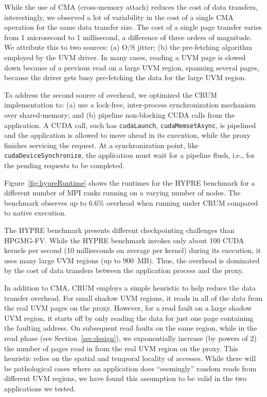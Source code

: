 \documentclass[11pt]{article}
\begin{document}
While the use of CMA (cross-memory attach) reduces the cost of data transfers,
interestingly, we
observed a lot of variability in the cost of a single CMA operation for the same
data transfer size. The cost of a single page transfer varies from 1 microsecond
to 1 millisecond, a difference of three orders of magnitude. We attribute this
to two sources: (a) O/S jitter; (b) the pre-fetching algorithm employed by the
UVM driver. In many cases, reading a UVM page is slowed down because of a
previous read on a large UVM region, spanning several pages, because the driver
gets busy pre-fetching the data for the large UVM region.

To address the second source of overhead, we optimized the CRUM implementation
to: (a) use a lock-free, inter-process synchronization mechanism over
shared-memory; and (b) pipeline non-blocking CUDA calls from the application. A
CUDA call, such has {\tt cudaLaunch}, {\tt cudaMemsetAsync}, is pipelined and
the application is allowed to move ahead in its execution, while the proxy
finishes servicing the request. At a synchronization point, like {\tt cudaDeviceSynchronize},
the application must wait for a pipeline flush, i.e., for the pending requests
to be completed.


Figure~\ref{fig:hypreRuntime} shows the runtimes for the HYPRE benchmark for a different
number of MPI ranks running on a varying number of nodes. The benchmark observes
up to 6.6\% overhead when running under CRUM compared to native execution.

The HYPRE benchmark presents different checkpointing challenges than HPGMG-FV.  While the HYPRE benchmark
invokes only about 100 CUDA kernels per second (10 milliseconds on average per
kernel) during its execution, it uses many large UVM regions (up to 900~MB).
Thus, the overhead is dominated by the cost of data transfers between the application
process and the proxy.

In addition to CMA, CRUM employs a simple heuristic to help reduce the data
transfer overhead.  For small shadow UVM regions, it reads in all of the data
from the real UVM pages on the proxy.  However, for a read fault on a large
shadow UVM region, it starts off by only reading the data for just one page
containing the faulting address. On subsequent read faults on the same region,
while in the read phase (see Section~\ref{sec:design}), we exponentially
increase (by powers of 2) the number of pages read in from the real UVM region
on the proxy. This heuristic relies on the spatial and temporal locality of
accesses. While there will be pathological cases where an application does
``seemingly'' random reads from different UVM regions, we have found this
assumption to be valid in the two applications we tested.
\end{document}
